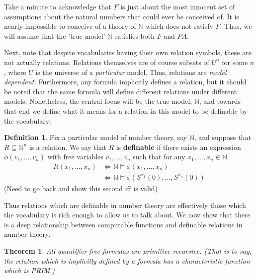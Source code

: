 \documentclass{article}
\theoremstyle{definition}
\newtheorem{definition}{Definition}[section]
\theoremstyle{plain}
\theoremstyle{theorem}
\newtheorem{theorem}{Theorem}[section]
\begin{document}
Take a minute to acknowledge that $F$ is just about the most innocent set of assumptions about the natural numbers that could ever be conceived of. It is nearly impossible to conceive of a theory of $\mathbb{N}$ which does not satisfy $F$. Thus, we will assume that the 'true model' $\mathbb{N}$ satisfies both $F$ and $PA$.
\par Next, note that despite vocabularies having their own relation symbols, these are not actually relations. Relations themselves are of course subsets of $U^n$ for some $n$, where $U$ is the universe of a \textit{particular} model. Thus, relations are \textit{model dependent.} Furthermore, any formula implicitly defines a relation, but it should be noted that the same formula will define different relations under different models. Nonetheless, the central focus will be the true model, $\mathbb{N}$, and towards that end we define what it means for a relation in this model to be definable by the vocabulary:
\begin{definition}
    Fix a particular model of number theory, say $\mathbb{N}$, and suppose that $R \subseteq \mathbb{N}^n$ is a relation. We say that $R$ is \textbf{definable} if there exists an expression $\phi(v_1,...,v_n)$ with free variables $v_1,...,v_n$ such that for any $x_1,...,x_n \in \mathbb{N}$ 
    \begin{align}
        R(x_1,...,x_n) &\iff \mathbb{N} \models \phi(x_1,...,x_n) \\
                       & \iff \mathbb{N} \models \phi(S^{x_1}(0),...,S^{x_n}(0))
    \end{align}
    (Need to go back and show this second iff is valid)
\end{definition}
Thus relations which are definable in number theory are effectively those which the vocabulary is rich enough to allow us to talk about. We now show that there is a deep relationship between computable functions and definable relations in number theory. 
\begin{theorem}
    All quantifier free formulas are primitive recursive. (That is to say, the relation which is implicitly defined by a formula has a characteristic function which is PRIM.)
\end{theorem}
\end{document}
